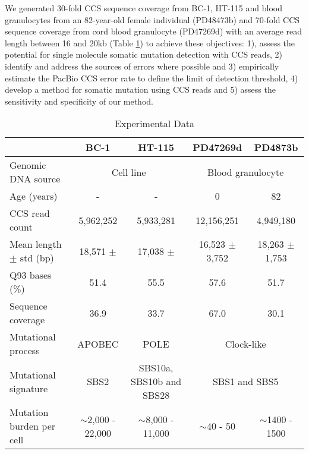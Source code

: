 We generated 30-fold CCS sequence coverage from BC-1, HT-115 and blood granulocytes from an 82-year-old female individual (PD48473b) and 70-fold CCS sequence coverage from cord blood granulocyte (PD47269d) with an average read length between 16 and 20kb (Table \ref{tab:CCS-sequence-statistics}) to achieve these objectives: 1), assess the potential for single molecule somatic mutation detection with CCS reads, 2) identify and address the sources of errors where possible and 3) empirically estimate the PacBio CCS error rate to define the limit of detection threshold, 4) develop a method for somatic mutation using CCS reads and 5) assess the sensitivity and specificity of our method.

\begin{table}[h]
\caption{Experimental Data}
\label{tab:CCS-sequence-statistics}
\begin{adjustbox}{max width=1.1\textwidth,center}
\begin{tabular}{l|cccc}
                                     & BC-1 & HT-115 & PD47269d & PD4873b \\ \hline
Genomic DNA source                   & \multicolumn{2}{c}{Cell line} & \multicolumn{2}{c}{Blood granulocyte} \\  \hline
Age (years)                 		 & - & - & 0 & 82  \\ \hline
CCS read count                       &  5,962,252 &  5,933,281 & 12,156,251 & 4,949,180 \\ \hline
Mean length $\pm$ std (bp)  & 18,571 $\pm$     & 17,038 $\pm$   &  16,523 $\pm$ 3,752 & 18,263 $\pm$ 1,753 \\ \hline
Q93 bases (\%) 						 & 51.4 & 55.5 & 57.6 & 51.7 \\ \hline
Sequence coverage 				     & 36.9 & 33.7 & 67.0 & 30.1 \\ \hline
Mutational process   			     & APOBEC & POLE & \multicolumn{2}{c}{Clock-like} \\ \hline
Mutational signature 				 & SBS2   & SBS10a, SBS10b and SBS28 & \multicolumn{2}{c}{SBS1 and SBS5} \\ \hline
Mutation burden per cell 		     & $\sim$2,000 - 22,000 & $\sim$8,000 - 11,000 & $\sim$40 - 50 & $\sim$1400 - 1500 \\ \hline 
\end{tabular}
\end{adjustbox} 
\end{table}

